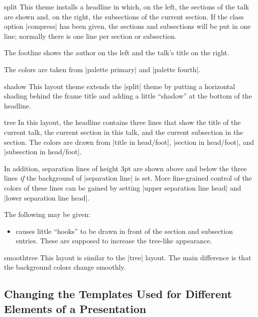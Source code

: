 \begin{outerthemeexample}{split}
  This theme installs a headline in which, on the left, the sections of the talk are shown and, on the right, the subsections of the current section. If the class option |compress| has been given, the sections and subsections will be put in one line; normally there is one line per section or subsection.

  The footline shows the author on the left and the talk's title on the right.

  The colors are taken from |palette primary| and |palette fourth|.
\end{outerthemeexample}

\begin{outerthemeexample}{shadow}
  This layout theme extends the |split| theme by putting a horizontal shading behind the frame title and adding a little ``shadow'' at the bottom of the headline.
\end{outerthemeexample}

\begin{outerthemeexample}{tree}
  In this layout, the headline contains three lines that show the title of the current talk, the current section in this talk, and the current subsection in the section. The colors are drawn from |title in head/foot|, |section in head/foot|, and |subsection in head/foot|.

  In addition, separation lines of height 3pt are shown above and below the three lines \emph{if} the background of |separation line| is set. More fine-grained control of the colors of these lines can be gained by setting |upper separation line head| and |lower separation line head|.

  The following  may be given:
  \begin{itemize}
    \item
     causes little ``hooks'' to be drawn in front of the section and subsection entries. These are supposed to increase the tree-like appearance.
  \end{itemize}
\end{outerthemeexample}

\begin{outerthemeexample}{smoothtree}
  This layout is similar to the |tree| layout. The main difference is that the background colors change smoothly.
\end{outerthemeexample}


\subsection{Changing the Templates Used for Different Elements of a Presentation}
\label{section-templates}

